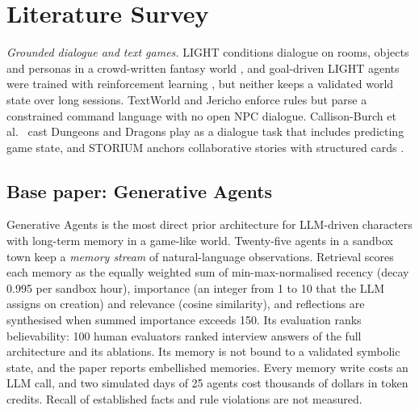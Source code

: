\documentclass[letterpaper,journal]{IEEEtran}
\begin{document}
\section{Literature Survey}\label{sec:related}

\emph{Grounded dialogue and text games.} LIGHT conditions dialogue on rooms, objects and personas in a crowd-written fantasy world \cite{urbanek2019light}, and goal-driven LIGHT agents were trained with reinforcement learning \cite{ammanabrolu2021dragon}, but neither keeps a validated world state over long sessions. TextWorld \cite{cote2019textworld} and Jericho \cite{hausknecht2020jericho} enforce rules but parse a constrained command language with no open NPC dialogue. Callison-Burch et al.~\cite{callisonburch2022dnd} cast Dungeons and Dragons play as a dialogue task that includes predicting game state, and STORIUM anchors collaborative stories with structured cards \cite{akoury2020storium}.

\subsection{Base paper: Generative Agents}\label{sec:base}
Generative Agents \cite{park2023generative} is the most direct prior architecture for LLM-driven characters with long-term memory in a game-like world. Twenty-five agents in a sandbox town keep a \emph{memory stream} of natural-language observations. Retrieval scores each memory as the equally weighted sum of min-max-normalised recency (decay 0.995 per sandbox hour), importance (an integer from 1 to 10 that the LLM assigns on creation) and relevance (cosine similarity), and reflections are synthesised when summed importance exceeds 150. Its evaluation ranks believability: 100 human evaluators ranked interview answers of the full architecture and its ablations. Its memory is not bound to a validated symbolic state, and the paper reports embellished memories. Every memory write costs an LLM call, and two simulated days of 25 agents cost thousands of dollars in token credits. Recall of established facts and rule violations are not measured.
\end{document}
